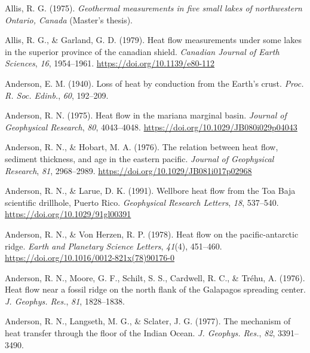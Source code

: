 \begin{CSLReferences}{1}{1}
\leavevmode{}%
Allis, R. G. (1975). \emph{Geothermal measurements in five small lakes of northwestern {Ontario, Canada}} (Master's thesis).

\leavevmode{}%
Allis, R. G., \& Garland, G. D. (1979). Heat flow measurements under some lakes in the superior province of the canadian shield. \emph{Canadian Journal of Earth Sciences}, \emph{16}, 1954--1961. \url{https://doi.org/10.1139/e80-112}

\leavevmode{}%
Anderson, E. M. (1940). Loss of heat by conduction from the {Earth's} crust. \emph{Proc. R. Soc. Edinb.}, \emph{60}, 192--209.

\leavevmode{}%
Anderson, R. N. (1975). Heat flow in the mariana marginal basin. \emph{Journal of Geophysical Research}, \emph{80}, 4043--4048. \url{https://doi.org/10.1029/JB080i029p04043}

\leavevmode{}%
Anderson, R. N., \& Hobart, M. A. (1976). The relation between heat flow, sediment thickness, and age in the eastern pacific. \emph{Journal of Geophysical Research}, \emph{81}, 2968--2989. \url{https://doi.org/10.1029/JB081i017p02968}

\leavevmode{}%
Anderson, R. N., \& Larue, D. K. (1991). Wellbore heat flow from the {Toa Baja} scientific drillhole, {Puerto Rico}. \emph{Geophysical Research Letters}, \emph{18}, 537--540. \url{https://doi.org/10.1029/91gl00391}

\leavevmode{}%
Anderson, R. N., \& Von Herzen, R. P. (1978). Heat flow on the pacific-antarctic ridge. \emph{Earth and Planetary Science Letters}, \emph{41}(4), 451--460. \url{https://doi.org/10.1016/0012-821x(78)90176-0}

\leavevmode{}%
Anderson, R. N., Moore, G. F., Schilt, S. S., Cardwell, R. C., \& Tréhu, A. (1976). Heat flow near a fossil ridge on the north flank of the {Galapagos} spreading center. \emph{J. Geophys. Res.}, \emph{81}, 1828--1838.

\leavevmode{}%
Anderson, R. N., Langseth, M. G., \& Sclater, J. G. (1977). The mechanism of heat transfer through the floor of the {Indian Ocean}. \emph{J. Geophys. Res.}, \emph{82}, 3391--3490.


\end{CSLReferences}
